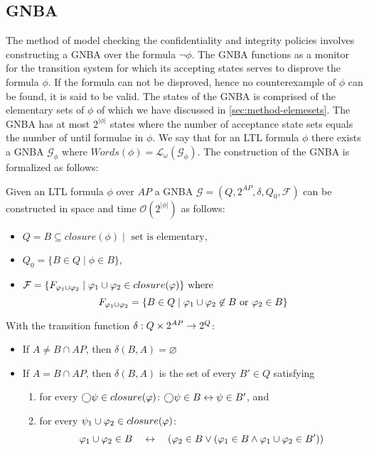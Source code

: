\subsection{GNBA}
The method of model checking the confidentiality and integrity policies involves constructing a GNBA over the formula $\lnot\phi$. The GNBA functions as a monitor for the transition system for which its accepting states serves to disprove the formula $\phi$. If the formula can not be disproved, hence no counterexample of $\phi$ can be found, it is said to be valid. The states of the GNBA is comprised of the elementary sets of $\phi$ of which we have discussed in \autoref{sec:method-elemesets}. The GNBA has at most $2^{|\phi|}$ states where the number of acceptance state sets equals the number of until formulae in $\phi$. We say that for an LTL formula $\phi$ there exists a GNBA $\mathcal{G_\phi}$ where $Words(\phi)=\mathcal{L}_\omega(\mathcal{G_\phi})$. The construction of the GNBA is formalized as follows:
\begin{definition}
\label{def:ltl-to-gnba}
Given an LTL formula $\phi$ over $AP$ a GNBA $\mathcal{G}=(Q,2^{AP},\delta,Q_0,\mathcal{F})$ can be constructed in space and time $\mathcal{O}(2^{|\phi|})$ as follows:
\begin{itemize}
    \item $Q = B \subseteq closure(\phi) \mid \text{ set is elementary}$,
    \item $Q_0 = \{ B \in Q \mid \phi \in B \}$,
    \item $\mathcal{F} = \{F_{\varphi_1 \cup \varphi_2} \mid \varphi_1 \cup \varphi_2 \in closure(\varphi)\} \text{ where }$
    \begin{equation*}
        F_{\varphi_1 \cup \varphi_2} = \{B \in Q \mid \varphi_1 \cup \varphi_2 \not\in B \text{ or } \varphi_2 \in B\}
    \end{equation*}
\end{itemize}
With the transition function $\delta : Q \times 2^{AP} \rightarrow 2^Q$:
\begin{itemize}
    \item If $A \neq B \cap AP$, then $\delta(B,A)=\varnothing$
    \item If $A = B \cap AP$, then $\delta(B,A)$ is the set of every $B'\in Q$ satisfying
    \begin{enumerate}
        \item for every $\bigcirc\psi \in closure(\varphi)$: $\bigcirc\psi \in B \leftrightarrow \psi \in B'$, and
        \item for every $\psi_1 \cup \varphi_2 \in closure(\varphi)$:
        \begin{equation*}
            \varphi_1 \cup \varphi_2 \in B \quad\leftrightarrow\quad (\varphi_2 \in B \lor (\varphi_1 \in B \land \varphi_1 \cup \varphi_2 \in B'))
        \end{equation*}
    \end{enumerate}
\end{itemize}
\end{definition}

